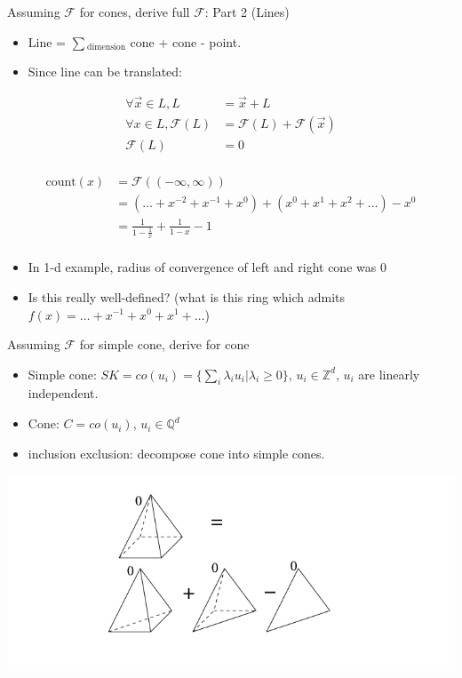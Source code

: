 \documentclass[8pt]{beamer}
\begin{document}
\begin{frame}[label=sec-8]{Assuming $\mathcal{F}$ for cones, derive full $\mathcal{F}$: Part 2 (Lines)}
\begin{itemize}
\item Line = $\sum$$_{\text{dimension}}$ cone + cone - point.
\item Since line can be translated:
\end{itemize}
\begin{align*}
\forall \vec{x} \in L, L &= \vec{x} + L \\
\forall x \in L, \mathcal{F}(L) &= \mathcal{F}(L) + \mathcal{F}(\vec{x})  \\
\mathcal{F}(L) &= 0 \\
\end{align*}

\begin{align*}
\text{count}(x) &= \mathcal{F}((-\infty, \infty)) \\
                &=( \ldots + x^{-2} + x^{-1} + x^0) + (x^0 + x^1 + x^2 + \ldots) - x^0 \\
                &= \frac{1}{1 - \frac{1}{x}} + \frac{1}{1 - x} - 1 \\ 
\end{align*}
\begin{itemize}
\item In 1-d example, radius of convergence of left and right cone was 0
\item Is this really well-defined? (what is this ring which admits $f(x) = \ldots + x^{-1} + x^0 + x^1 + \ldots$)
\end{itemize}
\end{frame}


\begin{frame}[label=sec-9]{Assuming $\mathcal{F}$ for simple cone, derive for cone}
\begin{itemize}
\item Simple cone: $SK = co(u_i) = \{ \sum_i \lambda_i u_i \vert \lambda_i \geq 0 \}$, $u_i \in \mathbb{Z}^d$, $u_i$ are linearly independent.
\item Cone: $C = co(u_i)$, $u_i \in \mathbb{Q}^d$
\item inclusion exclusion: decompose cone into simple cones.
\end{itemize}
\includegraphics[width=.9\linewidth]{./res/cut-cone-into-simple-cones.png}
\end{frame}
\end{document}
